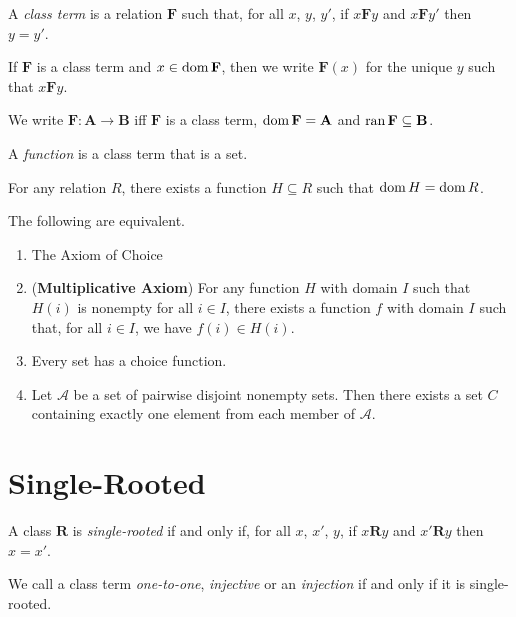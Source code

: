 \begin{definition}
    A \emph{class term} is a relation $\mathbf{F}$ such that, for all $x$, $y$,
    $y'$, if $x\mathbf{F}y$ and $x\mathbf{F}y'$ then $y = y'$.

    If $\mathbf{F}$ is a class term and $x \in \operatorname{dom} \mathbf{F}$, then we write
    $\mathbf{F}(x)$ for the unique $y$ such that $x \mathbf{F} y$.

    We write $\mathbf{F} : \mathbf{A} \rightarrow \mathbf{B}$ iff $\mathbf{F}$ is a class term,
    $\operatorname{dom} \mathbf{F} = \mathbf{A}$ and $\operatorname{ran} \mathbf{F} \subseteq \mathbf{B}$.

    A \emph{function} is a class term that is a set.
\end{definition}

\begin{axiom}
    For any relation $R$, there exists a function $H \subseteq R$ such that 
    $\operatorname{dom} H = \operatorname{dom} R$.
\end{axiom}

\begin{theorem}
    The following are equivalent.
    \begin{enumerate}
        \item The Axiom of Choice
        \item (\textbf{Multiplicative Axiom}) For any function $H$ with domain $I$ such that $H(i)$ is nonempty for all $i \in I$,
        there exists a function $f$ with domain $I$ such that, for all $i \in I$,
        we have $f(i) \in H(i)$.
        \item Every set has a choice function.
        \item Let $\mathcal{A}$ be a set of pairwise disjoint nonempty sets.
        Then there exists a set $C$ containing exactly one element from each
        member of $\mathcal{A}$.
    \end{enumerate}
\end{theorem}

\section{Single-Rooted}

\begin{definition}
    A class $\mathbf{R}$ is \emph{single-rooted} if and only if, for all $x$, $x'$, $y$, if $x\mathbf{R}y$ and $x'\mathbf{R}y$ then $x = x'$.

    We call a class term \emph{one-to-one}, \emph{injective} or an \emph{injection}
     if and only if it is single-rooted.
\end{definition}


